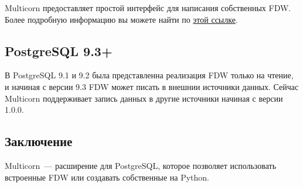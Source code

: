 Multicorn предоставляет простой интерфейс для написания собственных FDW. Более подробную информацию вы можете найти по \href{http://multicorn.org/implementing-an-fdw/}{этой ссылке}.


\subsection{PostgreSQL 9.3+}

В PostgreSQL 9.1 и 9.2 была представленна реализация FDW только на чтение, и начиная с версии 9.3 FDW может писать в внешнии источники данных. Сейчас Multicorn поддерживает запись данных в другие источники начиная с версии 1.0.0.

\subsection{Заключение}

Multicorn~--- расширение для PostgreSQL, которое позволяет использовать встроенные FDW или создавать собственные на Python.
